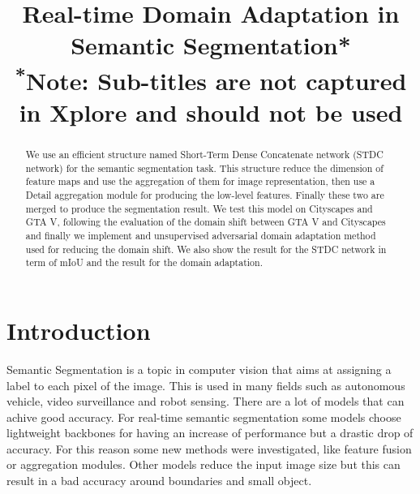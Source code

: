 \documentclass[conference]{IEEEtran}
\begin{document}
\title{Real-time Domain Adaptation in Semantic Segmentation*\\
{\footnotesize \textsuperscript{*}Note: Sub-titles are not captured in Xplore and
should not be used}
}

\author{
\and
{}
\and
{}
}

\maketitle

\begin{abstract}
We use an efficient structure named Short-Term Dense Concatenate network (STDC network) for the semantic segmentation task. This
structure reduce the dimension of feature maps and use the aggregation of them for image representation, then use a Detail aggregation
module for producing the low-level features. Finally these two are merged to produce the segmentation result. We test this model on 
Cityscapes and GTA V, following the evaluation of the domain shift between GTA V and Cityscapes and finally we implement and 
unsupervised adversarial domain adaptation method used for reducing the domain shift. We also show the result for the STDC network in
term of mIoU and the result for the domain adaptation. 
\end{abstract}


\section{Introduction}
Semantic Segmentation is a topic in computer vision that aims at assigning a label to each pixel of the image. This is used in many fields
such as autonomous vehicle, video surveillance and robot sensing. There are a lot of models that can achive good accuracy. For real-time
semantic segmentation some models choose lightweight backbones for having an increase of performance but a drastic drop of accuracy. For
this reason some new methods were investigated, like feature fusion or aggregation modules. Other models reduce the input image size 
but this can result in a bad accuracy around boundaries and small object. 
\end{document}
